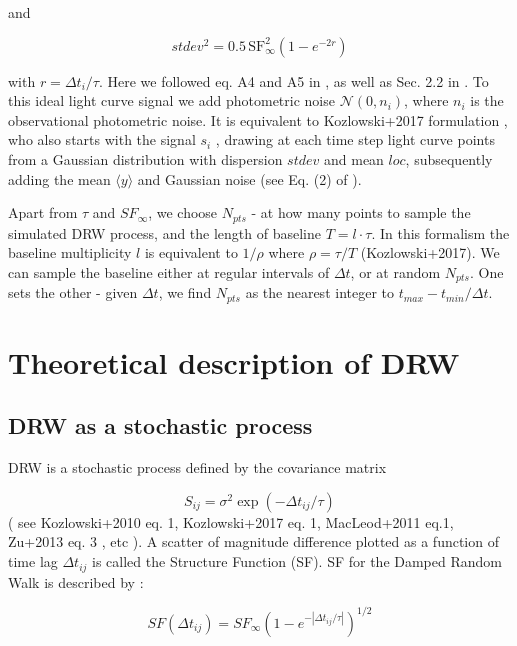 \documentclass[fleqn,usenatbib]{mnras}  %
\begin{document}
and 

\begin{equation}
stdev^{2} =  0.5  \, \mathrm{SF}_{\infty}^{2} \left( 1 - e ^{  - 2 r  }  \right)
\end{equation}

with  $r = \Delta t_{i} / \tau$.   Here we followed eq. A4 and A5 in \cite{kelly2009}, as well as Sec. 2.2 in \cite{macleod2010}.  To this ideal light curve signal we add photometric noise $\mathcal{N}(0,n_{i})$, where $n_{i}$ is the observational photometric noise.  It is equivalent to  Kozlowski+2017 formulation , who also starts with the signal $s_{i}$ , drawing at each time step light curve points from  a Gaussian distribution with dispersion  $stdev$ and mean $loc$, subsequently adding the mean $\langle y \rangle$ and Gaussian noise (see Eq. (2) of \cite{kozlowski2017a}).


Apart from $\tau$ and $SF_{\infty}$, we choose $N_{pts}$ - at how many points to sample the simulated DRW process, and the length of baseline $T = l \cdot \tau$.  In this formalism the baseline multiplicity $l$  is equivalent to $1 / \rho$ where  $\rho = \tau / T $  (Kozlowski+2017). We can sample the baseline either at regular intervals of $\Delta t$, or at random $N_{pts}$. One sets the other - given  $\Delta t$,  we find $N_{pts}$ as the nearest integer to $t_{max} - t_{min} / \Delta t $. 


\section{Theoretical description of DRW}

\subsection{DRW as a stochastic process}
DRW is a stochastic process defined by the covariance matrix  

\begin{equation}
S_{ij} = \sigma^{2} \exp{ \left(   -  \Delta t_{ij} / \tau \right)}
\end{equation}
( see Kozlowski+2010 eq. 1, Kozlowski+2017 eq. 1,  MacLeod+2011 eq.1, Zu+2013 eq. 3 , etc ).  A scatter of magnitude difference plotted as a function of time lag $\Delta t_{ij} $ is called the Structure Function (SF).  SF for the Damped Random Walk is described by  :

\begin{equation}
SF(\Delta t_{ij} ) = SF_{\infty} \left( 1 - e^{-|\Delta t_{ij} /\tau|} \right) ^{1/2}
\end{equation}
\end{document}
